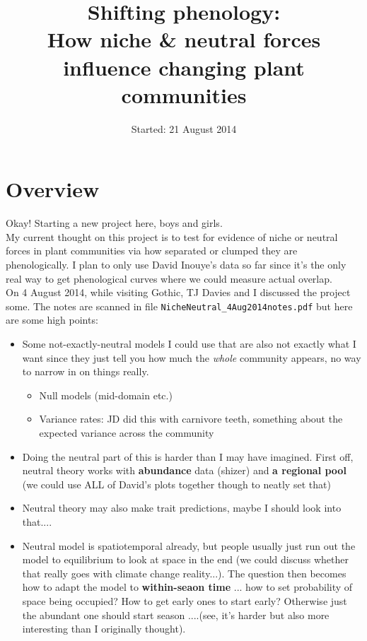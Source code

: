 \documentclass[11pt,a4paper]{article}
\begin{document}

\renewcommand{\refname}{\CHead{}}

\title{Shifting phenology: \\How niche \& neutral forces influence changing plant communities}
\date{Started: 21 August 2014}
\author{}
\maketitle

\section{Overview}
Okay! Starting a new project here, boys and girls.\\

My current thought on this project is to test for evidence of niche or neutral forces in plant communities via how separated or clumped they are phenologically. I plan to only use David Inouye's data so far since it's the only real way to get phenological curves where we could measure actual overlap.\\

On 4 August 2014, while visiting Gothic, TJ Davies and I discussed the project some. The notes are scanned in file \verb|NicheNeutral_4Aug2014notes.pdf| but here are some high points:
\begin{itemize}
\item Some not-exactly-neutral models I could use that are also not exactly what I want since they just tell you how much the \emph{whole} community appears, no way to narrow in on things really.
\begin{itemize}
\item Null models (mid-domain etc.)
\item Variance rates: JD did this with carnivore teeth, something about the expected variance across the community
\end{itemize}
\item Doing the neutral part of this is harder than I may have imagined. First off, neutral theory works with {\bf abundance} data (shizer) and {\bf a regional pool} (we could use ALL of David's plots together though to neatly set that)
\item Neutral theory may also make trait predictions, maybe I should look into that....
\item Neutral model is spatiotemporal already, but people usually just run out the model to equilibrium to look at space in the end (we could discuss whether that really goes with climate change reality...). The question then becomes how to adapt the model to {\bf within-seaon time} ... how to set probability of space being occupied? How to get early ones to start early? Otherwise just the abundant one should start season ....(see, it's harder but also more interesting than I originally thought).
\end{itemize}
\end{document}
